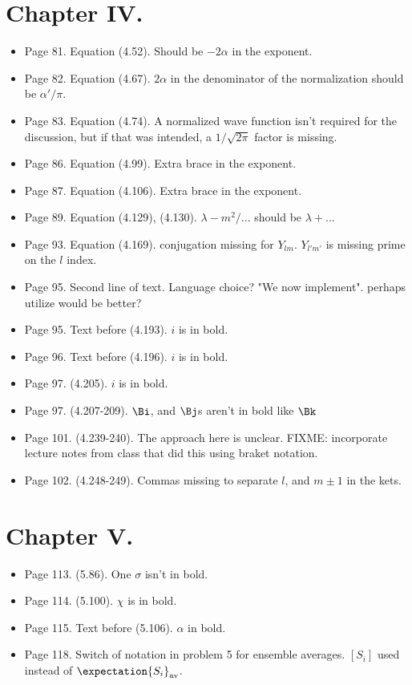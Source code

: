 \section{Chapter IV.}
\begin{itemize}
\item Page 81.  Equation (4.52).  Should be $-2\alpha$ in the exponent.
\item Page 82.  Equation (4.67).  $2\alpha$ in the denominator of the normalization should be $\alpha'/\pi$.
\item Page 83.  Equation (4.74).  A normalized wave function isn't required for the discussion, but if that was intended, a $1/\sqrt{2\pi}$ factor is missing.
\item Page 86.  Equation (4.99).  Extra brace in the exponent.
\item Page 87.  Equation (4.106).  Extra brace in the exponent.
\item Page 89.  Equation (4.129), (4.130).  $\lambda - m^2/...$ should be $\lambda + ...$
\item Page 93.  Equation (4.169).  conjugation missing for $Y_{lm}$.  $Y_{l'm'}$ is missing prime on the $l$ index.
\item Page 95.  Second line of text.  Language choice?  "We now implement".  perhaps utilize would be better?
\item Page 95.  Text before (4.193).  $i$ is in bold.
\item Page 96.  Text before (4.196).  $i$ is in bold.
\item Page 97.  (4.205).  $i$ is in bold.
\item Page 97.  (4.207-209).  $\Bi$, and $\Bj$s aren't in bold like $\Bk$
\item Page 101.  (4.239-240).  The approach here is unclear.  FIXME: incorporate lecture notes from class that did this using braket notation.
\item Page 102.  (4.248-249).  Commas missing to separate $l$, and $m\pm 1$ in the kets.
\end{itemize}

\section{Chapter V.}
\begin{itemize}
\item Page 113.  (5.86). One $\sigma$ isn't in bold.
\item Page 114.  (5.100). $\chi$ is in bold.
\item Page 115.  Text before (5.106). $\alpha$ in bold.
\item Page 118.  Switch of notation in problem 5 for ensemble averages.  $[S_i]$ used instead of $\expectation{S_i}_{\text{av}}$.
\end{itemize}

